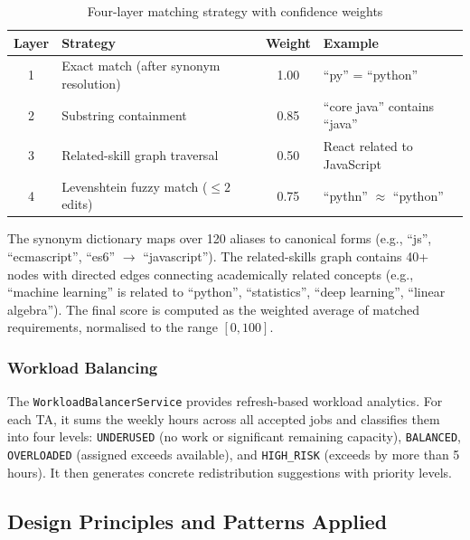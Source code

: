 \documentclass[12pt, a4paper]{article}
\begin{document}
\begin{table}[H]
\centering
\renewcommand{\arraystretch}{1.3}
\begin{tabular}{|c|l|c|l|}
\hline
\textbf{Layer} & \textbf{Strategy} & \textbf{Weight} & \textbf{Example} \\ \hline
1 & Exact match (after synonym resolution) & 1.00 & ``py'' = ``python'' \\ \hline
2 & Substring containment & 0.85 & ``core java'' contains ``java'' \\ \hline
3 & Related-skill graph traversal & 0.50 & React related to JavaScript \\ \hline
4 & Levenshtein fuzzy match ($\le 2$ edits) & 0.75 & ``pythn'' $\approx$ ``python'' \\ \hline
\end{tabular}
\caption{Four-layer matching strategy with confidence weights}
\end{table}

The synonym dictionary maps over 120 aliases to canonical forms (e.g., ``js'', ``ecmascript'', ``es6'' $\rightarrow$ ``javascript''). The related-skills graph contains 40+ nodes with directed edges connecting academically related concepts (e.g., ``machine learning'' is related to ``python'', ``statistics'', ``deep learning'', ``linear algebra''). The final score is computed as the weighted average of matched requirements, normalised to the range $[0, 100]$.

\subsubsection{Workload Balancing}
The \texttt{WorkloadBalancerService} provides refresh-based workload analytics. For each TA, it sums the weekly hours across all accepted jobs and classifies them into four levels: \texttt{UNDERUSED} (no work or significant remaining capacity), \texttt{BALANCED}, \texttt{OVERLOADED} (assigned exceeds available), and \texttt{HIGH\_RISK} (exceeds by more than 5 hours). It then generates concrete redistribution suggestions with priority levels.

\subsection{Design Principles and Patterns Applied}
\end{document}
